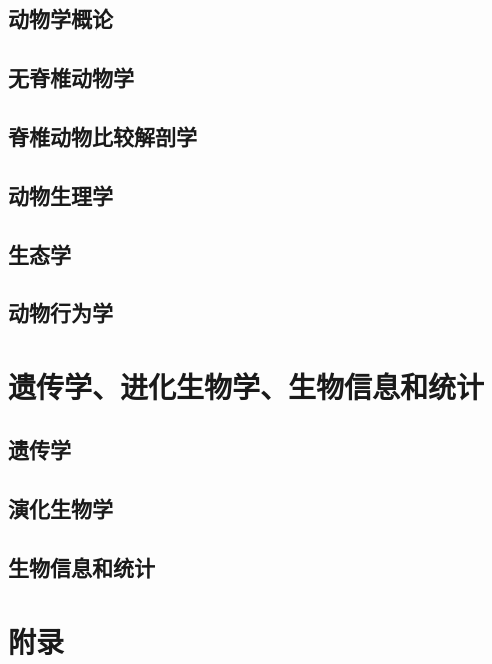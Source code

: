 \documentclass[b5paper,zihao=-4]{ctexbook}
\begin{document}
	\chapter{动物学概论}
		
	\chapter{无脊椎动物学}
		
	\chapter[脊椎比解]{脊椎动物比较解剖学}
		
	\chapter{动物生理学}
		
	\chapter{生态学}
		
	\chapter{动物行为学}
		

	\part{遗传学、进化生物学、生物信息和统计}
	\chapter{遗传学}
		
	\chapter{演化生物学}
		
	\chapter{生物信息和统计}
		



\part{附录}
\end{document}
